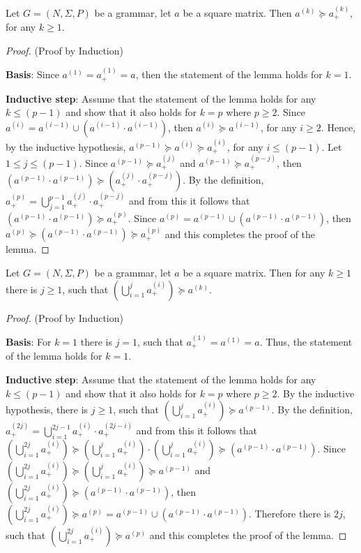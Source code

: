 \begin{lemma}\label{lemma:cf_geq_valiant}
	Let $G =(N,\Sigma,P)$ be a grammar, let $a$ be a square matrix. Then $a^{(k)} \succeq a^{(k)}_+$, for any $k \geq 1$.
\end{lemma}
\begin{proof}(Proof by Induction)
	
	\textbf{Basis}: Since $a^{(1)} = a^{(1)}_+ = a$, then the statement of the lemma holds for $k = 1$.
	
	\textbf{Inductive step}: Assume that the statement of the lemma holds for any $k \leq (p - 1)$ and show that it also holds for $k = p$ where $p \geq 2$. Since $a^{(i)} = a^{(i-1)} \cup (a^{(i-1)} \cdot a^{(i-1)})$, then $a^{(i)} \succeq a^{(i-1)}$, for any $i \geq 2$. Hence, by the inductive hypothesis, $a^{(p-1)} \succeq a^{(i)} \succeq a^{(i)}_+$, for any $i \leq (p-1)$. Let $1 \leq j \leq (p - 1)$. Since $a^{(p-1)} \succeq a^{(j)}_+$ and $a^{(p-1)} \succeq a^{(p-j)}_+$, then $(a^{(p-1)} \cdot a^{(p-1)}) \succeq (a^{(j)}_+ \cdot a^{(p-j)}_+)$. By the definition, $a^{(p)}_+ = \bigcup^{p-1}_{j=1}{a^{(j)}_+ \cdot a^{(p-j)}_+}$ and from this it follows that $(a^{(p-1)} \cdot a^{(p-1)}) \succeq a^{(p)}_+$. Since $a^{(p)} = a^{(p-1)} \cup (a^{(p-1)} \cdot a^{(p-1)})$, then $a^{(p)} \succeq (a^{(p-1)} \cdot a^{(p-1)}) \succeq a^{(p)}_+$ and this completes the proof of the lemma.
\end{proof}

\begin{lemma}\label{lemma:valiant_geq_cf}
	Let $G =(N,\Sigma,P)$ be a grammar, let $a$ be a square matrix. Then for any $k \geq 1$ there is $j \geq 1$, such that $(\bigcup^{j}_{i=1}{a^{(i)}_+}) \succeq a^{(k)}$.
\end{lemma}
\begin{proof}(Proof by Induction)
	
	\textbf{Basis}: For $k = 1$ there is $j = 1$, such that $a^{(1)}_+ = a^{(1)} = a$. Thus, the statement of the lemma holds for $k = 1$.
	
	\textbf{Inductive step}: Assume that the statement of the lemma holds for any $k \leq (p - 1)$ and show that it also holds for $k = p$ where $p \geq 2$. By the inductive hypothesis, there is $j \geq 1$, such that $(\bigcup^{j}_{i=1}{a^{(i)}_+}) \succeq a^{(p-1)}$. By the definition, $a^{(2j)}_+ = \bigcup^{2j-1}_{i=1}{a^{(i)}_+ \cdot a^{(2j-i)}_+}$ and from this it follows that $(\bigcup^{2j}_{i=1}{a^{(i)}_+}) \succeq (\bigcup^{j}_{i=1}{a^{(i)}_+}) \cdot (\bigcup^{j}_{i=1}{a^{(i)}_+}) \succeq (a^{(p-1)} \cdot a^{(p-1)})$. Since $(\bigcup^{2j}_{i=1}{a^{(i)}_+}) \succeq (\bigcup^{j}_{i=1}{a^{(i)}_+}) \succeq a^{(p-1)}$ and $(\bigcup^{2j}_{i=1}{a^{(i)}_+}) \succeq (a^{(p-1)} \cdot a^{(p-1)})$, then $(\bigcup^{2j}_{i=1}{a^{(i)}_+}) \succeq a^{(p)} = a^{(p-1)} \cup (a^{(p-1)} \cdot a^{(p-1)})$. Therefore there is $2j$, such that $(\bigcup^{2j}_{i=1}{a^{(i)}_+}) \succeq a^{(p)}$ and this completes the proof of the lemma.	
\end{proof}

